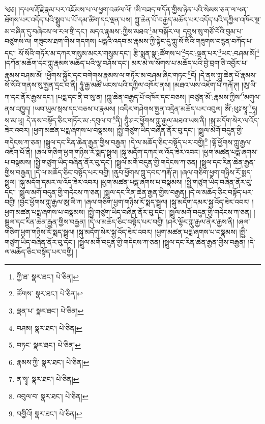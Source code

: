 \setcounter{footnote}{0} 
༄༅། །དཔལ་རྡོ་རྗེ་རྣམ་པར་འཇོམས་པ་ལ་ཕྱག་འཚལ་ལོ། །མི་བཟད་གདོན་གྱིས་ཉེན་པའི་སེམས་ཅན་ལ་ཕན་ཐོགས་པར་འདོད་པའི་སྒྲུབ་པ་པོ་དམ་ཚིག་དང་ལྡན་པས། ཀླུ་ཆེན་པོ་བརྒྱད་མཆོད་པར་འདོད་པའི་དཀྱིལ་འཁོར་སྔ་མ་བཞིན་དུ་བཞེངས་ལ་རལ་གྲི་དང་། མདའ་རྣམས་:ཀྱིས་མཐའ་\footnote{ཀྱི་ཐ་  སྣར་ཐང་།  པེ་ཅིན། }མ་བསྐོར་ལ། དབུས་སུ་གཙོ་བོའི་བུམ་པ་བཙུགས་ལ། གཟུངས་ཐག་གིས་གདགས། པདྨའི་འདབ་མ་རྣམས་ཀྱི་སྟེང་དུ་ཀླུ་སོ་སོའི་གཟུགས་བརྙན་བཀོད་པ་དང་། སོ་སོའི་གཏོར་མ་དཀར་གསུམ་མངར་གསུམ་དང་། རྩི་སྨན་སྣ་:ཚོགས་པ་\footnote{ཚོགས་  སྣར་ཐང་།  པེ་ཅིན། }དང་:ལྡན་པར་\footnote{ལྡན་པ་  སྣར་ཐང་།  པེ་ཅིན། }ཡང་:བཤམ་མོ།\footnote{བཤམ།  སྣར་ཐང་།  པེ་ཅིན། } །དཀོན་མཆོག་དང་ཀླུ་རྣམས་མཆོད་པའི་ལྷ་བཤོས་དང་། མར་མེ་ལ་སོགས་པ་མཆོད་པའི་བྱེ་བྲག་ཅི་འབྱོར་པ་རྣམས་བཤམ་མོ། །ཕྱོགས་སྐྱོང་དང་བགེགས་རྣམས་ལ་གཏོར་མ་བཤམ་ཞིང་གཏང་\footnote{བཏང་  སྣར་ཐང་།  པེ་ཅིན། }ངོ། །དེ་ནས་ཀླུ་ཆེན་པོ་རྣམས་སོ་སོའི་གནས་སུ་སྤྱན་དྲང་བ་ནི། ཧཱུཾ་རྒྱ་མཚོ་ཡངས་པའི་དཀྱིལ་འཁོར་ནས། །མཐའ་ཡས་འཇོག་པོ་ཀརྐོ་ཊ། །ཨུ་ལི་ཀ་དང་ནོར་རྒྱས་དང་། །པདྨ་དང་ནི་བ་སུ་ན། །ཀླུ་ཆེན་བརྒྱད་པོ་འཁོར་དང་བཅས། །བཙུན་མོ་:རྣམས་ཀྱིས་\footnote{རྣམས་ཀྱི་  སྣར་ཐང་།  པེ་ཅིན། }མགུལ་ནས་འཁྱུད། །ཡབ་ཡུམ་སྲས་དང་བཅས་པ་རྣམས། །འདིར་གཤེགས་སྤྱན་འདྲེན་མཆོད་པར་འབུལ། ཨོཾ་:ཕུཿ་སྭཱ་\footnote{ན་སྭཱ་  སྣར་ཐང་།  པེ་ཅིན། }ཧཱ། ས་མ་ཡཱ། དེ་ནས་བསྟོད་ཅིང་གཏོར་མ་:དབུལ་བ་\footnote{འབུལ་བ་  སྣར་ཐང་།  པེ་ཅིན། }ནི། ཧཱུྃ་ཤར་ཕྱོགས་ཀླུ་རྒྱལ་མཐའ་ཡས་ནི། །སྐུ་མདོག་སེར་ལ་འོད་ཟེར་འབར། །ཕྱག་མཚན་པདྨ་ཞགས་པ་བསྣམས། །སྤྱི་གཙུག་ཡིད་བཞིན་ནོར་བུ་དང་། །སྦྲུལ་མགོ་བདུན་གྱི་གདེངས་ཀ་ཅན། །སྦྲུལ་དང་རིན་ཆེན་རྒྱན་གྱིས་བརྒྱན། །དེ་ལ་མཆོད་ཅིང་བསྟོད་པར་བགྱི།\footnote{བགྱིའོ།  སྣར་ཐང་།  པེ་ཅིན། } །ལྷོ་ཕྱོགས་ཀླུ་རྒྱལ་འཇོག་པོ་ནི། །ཞལ་གཅིག་ཕྱག་གཉིས་རོ་སྨད་སྦྲུལ། །སྐུ་མདོག་དཀར་ལ་འོད་ཟེར་འབར། །ཕྱག་མཚན་པདྨ་ཞགས་པ་བསྣམས། །སྤྱི་གཙུག་ཡིད་བཞིན་ནོར་བུ་དང་། །སྦྲུལ་མགོ་བདུན་གྱི་གདེངས་ཀ་ཅན། །སྦྲུལ་དང་རིན་ཆེན་རྒྱན་གྱིས་བརྒྱན། །དེ་ལ་མཆོད་ཅིང་བསྟོད་པར་བགྱི། །ནུབ་ཕྱོགས་ཀླུ་དབང་ཀརྐོ་ཊ། །ཞལ་གཅིག་ཕྱག་གཉིས་རོ་སྨད་སྦྲུལ། །སྐུ་མདོག་དམར་ལ་འོད་ཟེར་འབར། །ཕྱག་མཚན་པདྨ་ཞགས་པ་བསྣམས། །སྤྱི་གཙུག་ཡིད་བཞིན་ནོར་བུ་དང་། །སྦྲུལ་མགོ་བདུན་གྱི་གདེངས་ཀ་ཅན། །སྦྲུལ་དང་རིན་ཆེན་རྒྱན་གྱིས་བརྒྱན། །དེ་ལ་མཆོད་ཅིང་བསྟོད་པར་བགྱི། །བྱང་ཕྱོགས་ཀླུ་རྒྱལ་ཨུ་ལི་ཀ །ཞལ་གཅིག་ཕྱག་གཉིས་རོ་སྨད་སྦྲུལ། །སྐུ་མདོག་དམར་སྐྱ་འོད་ཟེར་འབར། །ཕྱག་མཚན་པདྨ་ཞགས་པ་བསྣམས། །སྤྱི་གཙུག་ཡིད་བཞིན་ནོར་བུ་དང་། །སྦྲུལ་མགོ་བདུན་གྱི་གདེངས་ཀ་ཅན། །སྦྲུལ་དང་རིན་ཆེན་རྒྱན་གྱིས་བརྒྱན། །དེ་ལ་མཆོད་ཅིང་བསྟོད་པར་བགྱི། །ཤར་ལྷོར་ཀླུ་རྒྱལ་ནོར་རྒྱས་ནི། །ཞལ་གཅིག་ཕྱག་གཉིས་རོ་སྨད་སྦྲུལ། །སྐུ་མདོག་སེར་སྐྱ་འོད་ཟེར་འབར། །ཕྱག་མཚན་པདྨ་ཞགས་པ་བསྣམས། །སྤྱི་གཙུག་ཡིད་བཞིན་ནོར་བུ་དང་། །སྦྲུལ་མགོ་བདུན་གྱི་གདེངས་ཀ་ཅན། །སྦྲུལ་དང་རིན་ཆེན་རྒྱན་གྱིས་བརྒྱན། །དེ་ལ་མཆོད་ཅིང་བསྟོད་པར་བགྱི། །
